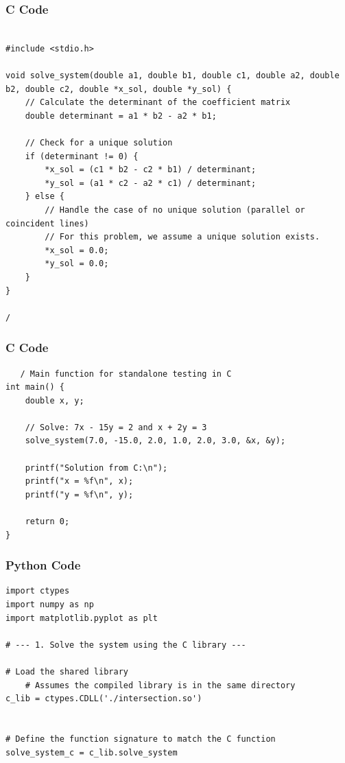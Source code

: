 \documentclass{beamer}
\begin{document}
\begin{frame}[fragile]
    \frametitle{C Code}
    \begin{lstlisting}

#include <stdio.h>

void solve_system(double a1, double b1, double c1, double a2, double b2, double c2, double *x_sol, double *y_sol) {
    // Calculate the determinant of the coefficient matrix
    double determinant = a1 * b2 - a2 * b1;
    
    // Check for a unique solution
    if (determinant != 0) {
        *x_sol = (c1 * b2 - c2 * b1) / determinant;
        *y_sol = (a1 * c2 - a2 * c1) / determinant;
    } else {
        // Handle the case of no unique solution (parallel or coincident lines)
        // For this problem, we assume a unique solution exists.
        *x_sol = 0.0;
        *y_sol = 0.0;
    }
}

/
    \end{lstlisting}
\end{frame}

\begin{frame}[fragile]
    \frametitle{C Code}
    \begin{lstlisting}
   / Main function for standalone testing in C
int main() {
    double x, y;
    
    // Solve: 7x - 15y = 2 and x + 2y = 3
    solve_system(7.0, -15.0, 2.0, 1.0, 2.0, 3.0, &x, &y);
    
    printf("Solution from C:\n");
    printf("x = %f\n", x);
    printf("y = %f\n", y);
    
    return 0;
}
    \end{lstlisting}
\end{frame}



\begin{frame}[fragile]
    \frametitle{Python Code}
    \begin{lstlisting}
import ctypes
import numpy as np
import matplotlib.pyplot as plt

# --- 1. Solve the system using the C library ---

# Load the shared library
    # Assumes the compiled library is in the same directory
c_lib = ctypes.CDLL('./intersection.so')


# Define the function signature to match the C function
solve_system_c = c_lib.solve_system


    \end{lstlisting}
\end{frame}
\end{document}
